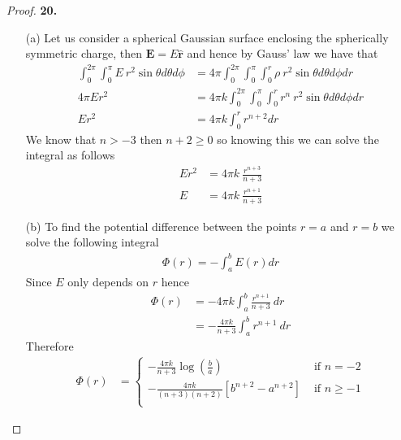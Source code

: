 \documentclass[11pt]{article}
\newcommand{\hatr}{\bm{\hat{r}}}
\theoremstyle{definition}
\begin{document}
\begin{proof}{\textbf{20.}}
    \begin{itemize}
        \item [(a)] Let us consider a spherical Gaussian surface enclosing
        the spherically symmetric charge, then $\bm{E} = E\hatr$ and hence by
        Gauss' law we have that
        \begin{align*}
            \int_{0}^{2\pi}\int_{0}^{\pi} E~r^2\sin\theta d\theta d\phi
            &= 4\pi\int_{0}^{2\pi}\int_{0}^{\pi}\int_{0}^{r}
            \rho~r^2\sin\theta d\theta d\phi dr\\
            4\pi Er^2 &= 
            4\pi k\int_{0}^{2\pi}\int_{0}^{\pi}\int_{0}^{r}
            r^n~r^2\sin\theta d\theta d\phi dr\\
            Er^2 &= 4\pi k\int_{0}^{r} r^{n + 2} dr
        \end{align*}
        We know that $n > -3$ then $n + 2 \geq 0$ so knowing this we can solve
        the integral as follows
        \begin{align*}
            Er^2 &= 4\pi k~\frac{r^{n + 3}}{n+3}\\
            E &= 4\pi k~\frac{r^{n + 1}}{n+3}
        \end{align*}

        \item [(b)] To find the potential difference between the points
        $r = a$ and $r = b$ we solve the following integral
        \begin{align*}
            \Phi(r) = - \int_a^b E(r) dr
        \end{align*}
        Since $E$ only depends on $r$ hence
        \begin{align*}
            \Phi(r) &= - 4\pi k \int_a^b \frac{r^{n + 1}}{n+3}~dr\\
                &= - \frac{4\pi k}{n+3} \int_a^b r^{n + 1}~dr
        \end{align*}
        Therefore
        \begin{align*}
            \Phi(r) &= \begin{cases}
                - \frac{4\pi k}{n+3} \log(\frac{b}{a}) &\text{ if }n = -2\\
                - \frac{4\pi k}{(n+3)(n+2)}[b^{n+2} - a^{n+2}]
                &\text{ if }n \geq -1\\
            \end{cases}
        \end{align*}
    \end{itemize}
\end{proof}
\end{document}
